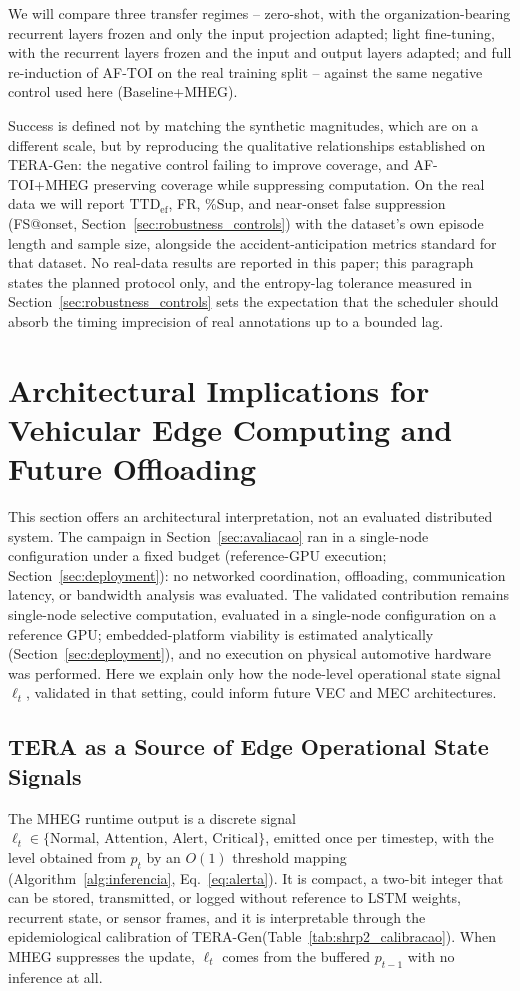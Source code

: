 \documentclass[a4paper,fleqn]{cas-dc}
\newcommand{\TERAGen}{\mbox{TERA-Gen}\xspace}
\newcommand{\AFTOI}{\mbox{AF-TOI}\xspace}
\newcommand{\MHEG}{\mbox{MHEG}\xspace}
\begin{document}
We will compare three transfer regimes --
zero-shot, with the organization-bearing recurrent layers frozen and only the
input projection adapted; light fine-tuning, with the recurrent layers frozen and
the input and output layers adapted; and full re-induction of \AFTOI on the real
training split -- against the same negative control used here (Baseline+MHEG).

Success is defined not by matching the synthetic magnitudes, which are on a
different scale, but by reproducing the qualitative relationships established on
\TERAGen: the negative control failing to improve coverage, and \mbox{AF-TOI}+MHEG
preserving coverage while suppressing computation. On the real data we will report
$\mathrm{TTD}_{\mathrm{ef}}$, FR, \%Sup, and near-onset false suppression
(FS@onset, Section~\ref{sec:robustness_controls}) with the dataset's own episode
length and sample size, alongside the accident-anticipation metrics standard for
that dataset. No real-data results are reported in this paper; this paragraph
states the planned protocol only, and the entropy-lag tolerance measured in
Section~\ref{sec:robustness_controls} sets the expectation that the scheduler
should absorb the timing imprecision of real annotations up to a bounded lag.
\section{Architectural Implications for Vehicular Edge Computing and Future Offloading}
\label{sec:vecmec}
This section offers an architectural interpretation, not an evaluated
distributed system. The campaign in Section~\ref{sec:avaliacao} ran in a single-node
configuration under a fixed budget {\color{\revcolor}(reference-GPU
execution; Section~\ref{sec:deployment})}: no networked coordination, offloading,
communication latency, or bandwidth analysis was evaluated. {\color{\revcolor}The validated
contribution remains single-node selective computation, evaluated in a
single-node configuration on a reference GPU; embedded-platform viability is
estimated analytically (Section~\ref{sec:deployment}), and no execution on
physical automotive hardware was performed.} Here we explain
only how the node-level operational state signal $\ell_t$, validated in that
setting, could inform future VEC and MEC architectures.
\subsection{TERA as a Source of Edge Operational State Signals}
\label{sec:tera_opsignal}
The \MHEG runtime output is a discrete signal
$\ell_t \in \{\text{Normal},\, \text{Attention},\, \text{Alert},\,
\text{Critical}\}$, emitted once per timestep{\color{\revcolor}, with the level
obtained from $p_t$ by an $O(1)$ threshold mapping
(Algorithm~\ref{alg:inferencia}, Eq.~\ref{eq:alerta})}. It is compact, a two-bit
integer that can be stored, transmitted, or logged without reference to LSTM
weights, recurrent state, or sensor frames, and it is interpretable through the
epidemiological calibration of \TERAGen (Table~\ref{tab:shrp2_calibracao}). When
\MHEG suppresses the update, $\ell_t$ comes from the buffered $p_{t-1}$ with no
inference at all.
\end{document}
